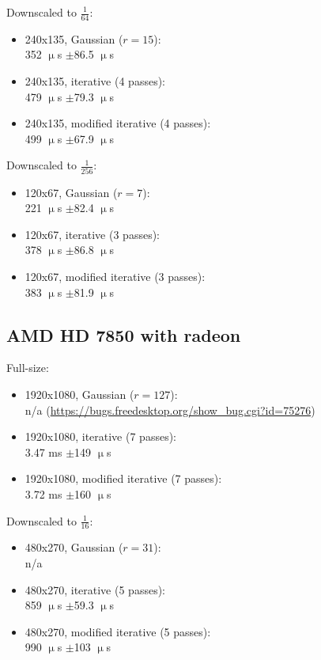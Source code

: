 \documentclass[english,fleqn,10pt,twocolumn]{article}
\begin{document}
Downscaled to $\frac 1{64}$:
\begin{itemize}
    \item 240x135, Gaussian ($r = 15$): \\
        352 $\upmu$s $\pm$86.5 $\upmu$s
    \item 240x135, iterative (4 passes): \\
        479 $\upmu$s $\pm$79.3 $\upmu$s
    \item 240x135, modified iterative (4 passes): \\
        499 $\upmu$s $\pm$67.9 $\upmu$s
\end{itemize}

Downscaled to $\frac 1{256}$:
\begin{itemize}
    \item 120x67, Gaussian ($r = 7$): \\
        221 $\upmu$s $\pm$82.4 $\upmu$s
    \item 120x67, iterative (3 passes): \\
        378 $\upmu$s $\pm$86.8 $\upmu$s
    \item 120x67, modified iterative (3 passes): \\
        383 $\upmu$s $\pm$81.9 $\upmu$s
\end{itemize}

\newpage

\subsection{AMD HD 7850 with radeon}

Full-size:
\begin{itemize}
    \item 1920x1080, Gaussian ($r = 127$): \\
        n/a (\url{https://bugs.freedesktop.org/show\_bug.cgi?id=75276})
    \item 1920x1080, iterative (7 passes): \\
        3.47 ms $\pm$149 $\upmu$s
    \item 1920x1080, modified iterative (7 passes): \\
        3.72 ms $\pm$160 $\upmu$s
\end{itemize}

Downscaled to $\frac 1{16}$:
\begin{itemize}
    \item 480x270, Gaussian ($r = 31$): \\
        n/a
    \item 480x270, iterative (5 passes): \\
        859 $\upmu$s $\pm$59.3 $\upmu$s
    \item 480x270, modified iterative (5 passes): \\
        990 $\upmu$s $\pm$103 $\upmu$s
\end{itemize}
\end{document}
